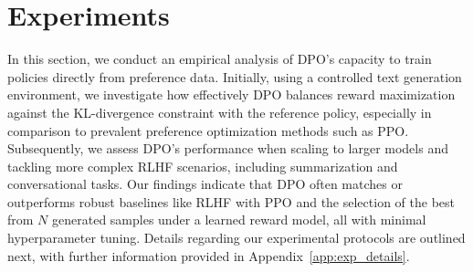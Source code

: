 \section{Experiments}
In this section, we conduct an empirical analysis of DPO's capacity to train policies directly from preference data. Initially, using a controlled text generation environment, we investigate how effectively DPO balances reward maximization against the KL-divergence constraint with the reference policy, especially in comparison to prevalent preference optimization methods such as PPO. Subsequently, we assess DPO’s performance when scaling to larger models and tackling more complex RLHF scenarios, including summarization and conversational tasks. Our findings indicate that DPO often matches or outperforms robust baselines like RLHF with PPO and the selection of the best from $N$ generated samples under a learned reward model, all with minimal hyperparameter tuning. Details regarding our experimental protocols are outlined next, with further information provided in Appendix~\ref{app:exp_details}.

